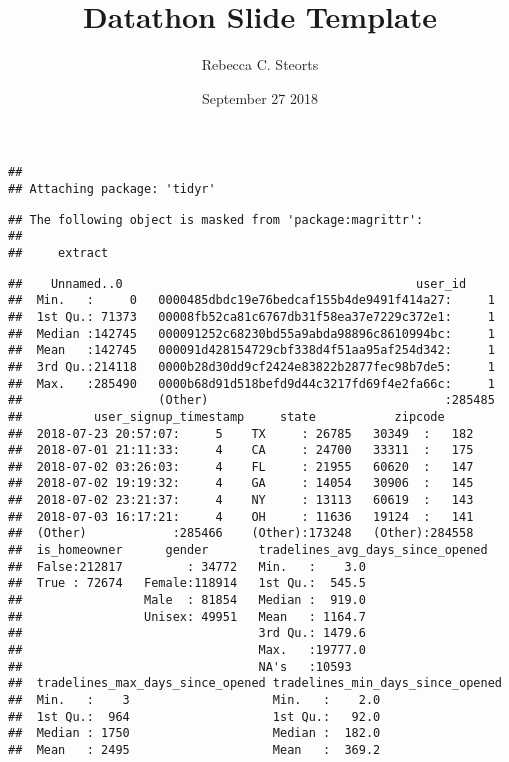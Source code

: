 \documentclass[ignorenonframetext,]{beamer}
\title{Datathon Slide Template}
\author{Rebecca C. Steorts}
\date{September 27 2018}
\begin{document}
\frame{\titlepage}

\begin{frame}[fragile]

\begin{verbatim}
## 
## Attaching package: 'tidyr'
\end{verbatim}

\begin{verbatim}
## The following object is masked from 'package:magrittr':
## 
##     extract
\end{verbatim}

\begin{verbatim}
##    Unnamed..0                                         user_id      
##  Min.   :     0   0000485dbdc19e76bedcaf155b4de9491f414a27:     1  
##  1st Qu.: 71373   00008fb52ca81c6767db31f58ea37e7229c372e1:     1  
##  Median :142745   000091252c68230bd55a9abda98896c8610994bc:     1  
##  Mean   :142745   000091d428154729cbf338d4f51aa95af254d342:     1  
##  3rd Qu.:214118   0000b28d30dd9cf2424e83822b2877fec98b7de5:     1  
##  Max.   :285490   0000b68d91d518befd9d44c3217fd69f4e2fa66c:     1  
##                   (Other)                                 :285485  
##          user_signup_timestamp     state           zipcode      
##  2018-07-23 20:57:07:     5    TX     : 26785   30349  :   182  
##  2018-07-01 21:11:33:     4    CA     : 24700   33311  :   175  
##  2018-07-02 03:26:03:     4    FL     : 21955   60620  :   147  
##  2018-07-02 19:19:32:     4    GA     : 14054   30906  :   145  
##  2018-07-02 23:21:37:     4    NY     : 13113   60619  :   143  
##  2018-07-03 16:17:21:     4    OH     : 11636   19124  :   141  
##  (Other)            :285466    (Other):173248   (Other):284558  
##  is_homeowner      gender       tradelines_avg_days_since_opened
##  False:212817         : 34772   Min.   :    3.0                 
##  True : 72674   Female:118914   1st Qu.:  545.5                 
##                 Male  : 81854   Median :  919.0                 
##                 Unisex: 49951   Mean   : 1164.7                 
##                                 3rd Qu.: 1479.6                 
##                                 Max.   :19777.0                 
##                                 NA's   :10593                   
##  tradelines_max_days_since_opened tradelines_min_days_since_opened
##  Min.   :    3                    Min.   :    2.0                 
##  1st Qu.:  964                    1st Qu.:   92.0                 
##  Median : 1750                    Median :  182.0                 
##  Mean   : 2495                    Mean   :  369.2                 

\end{verbatim}
\end{frame}
\end{document}
